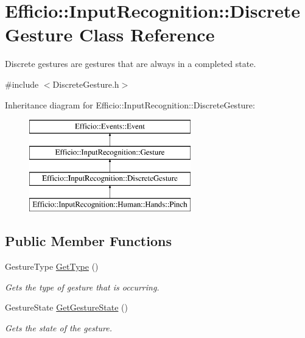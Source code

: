 \hypertarget{class_efficio_1_1_input_recognition_1_1_discrete_gesture}{}\section{Efficio\+:\+:Input\+Recognition\+:\+:Discrete\+Gesture Class Reference}
\label{class_efficio_1_1_input_recognition_1_1_discrete_gesture}


Discrete gestures are gestures that are always in a completed state.  




{\ttfamily \#include $<$Discrete\+Gesture.\+h$>$}

Inheritance diagram for Efficio\+:\+:Input\+Recognition\+:\+:Discrete\+Gesture\+:\begin{figure}[H]
\begin{center}
\leavevmode
\includegraphics[height=4.000000cm]{class_efficio_1_1_input_recognition_1_1_discrete_gesture}
\end{center}
\end{figure}
\subsection*{Public Member Functions}
\begin{DoxyCompactItemize}
\item 
Gesture\+Type \hyperlink{class_efficio_1_1_input_recognition_1_1_discrete_gesture_aa41d3e90b680094da94183a1a1ed3b2a}{Get\+Type} ()\hypertarget{class_efficio_1_1_input_recognition_1_1_discrete_gesture_aa41d3e90b680094da94183a1a1ed3b2a}{}\label{class_efficio_1_1_input_recognition_1_1_discrete_gesture_aa41d3e90b680094da94183a1a1ed3b2a}

\begin{DoxyCompactList}\small\item\em Gets the type of gesture that is occurring. \end{DoxyCompactList}\item 
Gesture\+State \hyperlink{class_efficio_1_1_input_recognition_1_1_discrete_gesture_a18ff1c5231925c581ac3a6add9edfd67}{Get\+Gesture\+State} ()\hypertarget{class_efficio_1_1_input_recognition_1_1_discrete_gesture_a18ff1c5231925c581ac3a6add9edfd67}{}\label{class_efficio_1_1_input_recognition_1_1_discrete_gesture_a18ff1c5231925c581ac3a6add9edfd67}

\begin{DoxyCompactList}\small\item\em Gets the state of the gesture. \end{DoxyCompactList}\end{DoxyCompactItemize}


